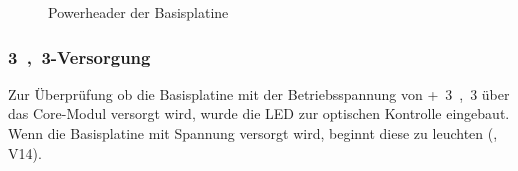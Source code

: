 \begin{figure}[htb]
    \centering
    \qquad
    \qquad
    \caption[Powerheader der Basisplatine]{Powerheader der \gls{Basisplatine}}
    \label{fig:basisplatine-pwrhdr}
\end{figure}

\subsubsection{\unit{3,3}{\volt}-Versorgung}
Zur Überprüfung ob die \gls{Basisplatine} mit der Betriebsspannung von \unit{+3,3}{\volt} über das \gls{Core-Modul} versorgt wird, wurde die LED zur optischen Kontrolle eingebaut. Wenn die Basisplatine mit Spannung versorgt wird, beginnt diese zu leuchten (, V14).

